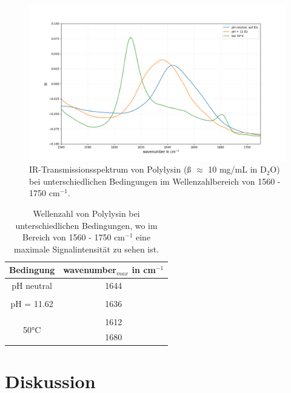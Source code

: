 \documentclass[10pt,a4paper]{article}
\begin{document}
			\begin{figure}[H]
				\centering
				\includegraphics[scale=0.55]{Polylysin.png}
				\caption{IR-Transmissionsspektrum von Polylysin (ß $\approx$ 10 mg/mL in D$_2$O) bei unterschiedlichen Bedingungen im Wellenzahlbereich von 1560 - 1750 cm$^{-1}$.}
				\label{fig:polylysin_IR_Spektrum}
			\end{figure}
			
			\begin{table}[H]
				\centering
				\caption{Wellenzahl von Polylysin bei unterschiedlichen Bedingungen, wo im Bereich von 1560 - 1750 cm$^{-1}$ eine maximale Signalintensität zu sehen ist.}
				\label{tab:Polylysin_SI}
				\begin{tabular}{cc}
					\toprule
					Bedingung & wavenumber$_{max}$ in cm$^{-1}$\\
					\midrule
					pH neutral & 1644\\
					&\\
					pH = 11.62 & 1636\\
					&\\
					\multirow{2}{*}{50°C } & 1612\\
					& 1680\\
					\bottomrule
				\end{tabular}
			\end{table}	

	
	\section{Diskussion}
\end{document}

